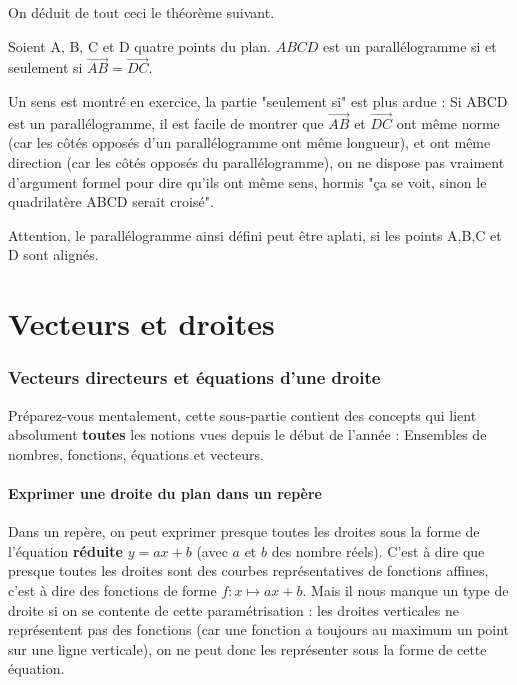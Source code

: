 \documentclass[10pt,a4paper,oneside]{book}
\begin{document}
On déduit de tout ceci le théorème suivant.

\begin{theo}
 Soient A, B, C et D quatre points du plan.  $ABCD$ est un parallélogramme si et seulement si $\overrightarrow{AB}=\overrightarrow{DC}$.
\end{theo}

Un sens est montré en exercice, la partie "seulement si" est plus ardue : Si ABCD est un parallélogramme, il est facile de montrer que $\overrightarrow{AB}$ et $\overrightarrow{DC}$ ont même norme (car les côtés opposés d'un parallélogramme ont même longueur), 
et ont même direction (car les côtés opposés du parallélogramme), on ne dispose pas vraiment d'argument formel pour dire qu'ils ont même sens, hormis "ça se voit, sinon le quadrilatère ABCD serait croisé".

Attention, le parallélogramme ainsi défini peut être aplati, si les points A,B,C et D sont alignés.



\chapter{Vecteurs et droites}

\subsection{Vecteurs directeurs et équations d'une droite}

Préparez-vous mentalement, cette sous-partie contient des concepts qui lient absolument \textbf{toutes} les notions vues depuis le début de l'année : Ensembles de nombres, fonctions, équations et vecteurs.

\subsubsection{Exprimer une droite du plan dans un repère}

Dans un repère, on peut exprimer presque toutes les droites sous la forme de l'équation \textbf{réduite} $y=ax+b$ (avec $a$ et $b$ des nombre réels). C'est à dire que presque toutes les droites sont des courbes représentatives de fonctions affines, c'est à dire des fonctions de forme $f : x \mapsto ax+b$. 
Mais il nous manque un type de droite si on se contente de cette paramétrisation : les droites verticales ne représentent pas des fonctions (car une fonction a toujours au maximum un point sur une ligne verticale), on ne peut donc les représenter sous la forme de cette équation.
\end{document}
